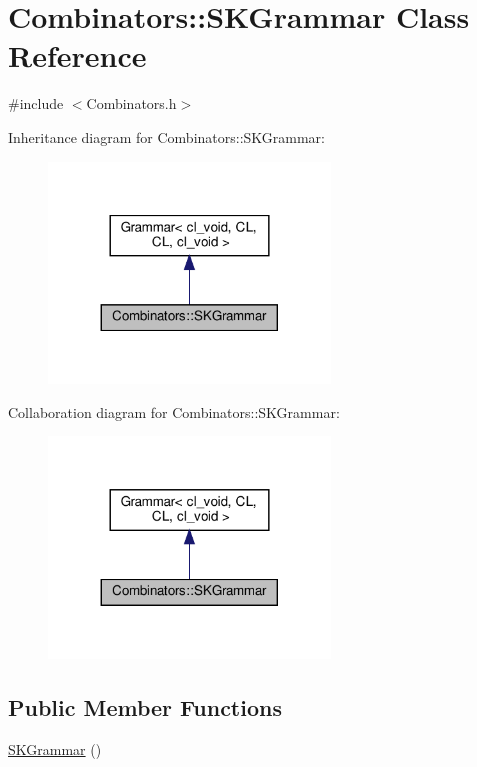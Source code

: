 \hypertarget{class_combinators_1_1_s_k_grammar}{}\section{Combinators\+:\+:S\+K\+Grammar Class Reference}
\label{class_combinators_1_1_s_k_grammar}


{\ttfamily \#include $<$Combinators.\+h$>$}



Inheritance diagram for Combinators\+:\+:S\+K\+Grammar\+:
\nopagebreak
\begin{figure}[H]
\begin{center}
\leavevmode
\includegraphics[width=212pt]{class_combinators_1_1_s_k_grammar__inherit__graph}
\end{center}
\end{figure}


Collaboration diagram for Combinators\+:\+:S\+K\+Grammar\+:
\nopagebreak
\begin{figure}[H]
\begin{center}
\leavevmode
\includegraphics[width=212pt]{class_combinators_1_1_s_k_grammar__coll__graph}
\end{center}
\end{figure}
\subsection*{Public Member Functions}
\begin{DoxyCompactItemize}
\item 
\hyperlink{class_combinators_1_1_s_k_grammar_a6bdc75326a1d81758bb23036de2819f0}{S\+K\+Grammar} ()
\end{DoxyCompactItemize}
